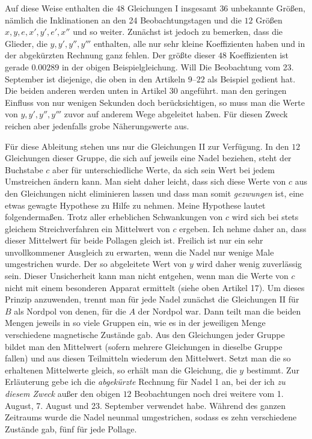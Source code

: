 Auf diese Weise enthalten die $48$ Gleichungen I insgesamt $36$ unbekannte Größen, nämlich die Inklinationen an den 24 Beobachtungstagen und die $12$ Größen $x,y,e,x',y',e',x''$ und so weiter. Zunächst ist jedoch zu bemerken, dass die Glieder, die $y,y',y'',y'''$ enthalten, alle nur sehr kleine Koeffizienten haben und in der abgekürzten Rechnung ganz fehlen. Der größte dieser $48$ Koeffizienten ist gerade $0.00289$ in der obigen Beispielgleichung. Will
\expandafter\def\csname HistoricalNoteText486\endcsname{Die Beobachtung vom 23. September ist diejenige, die oben in den Artikeln $9$–$22$ als Beispiel gedient hat. Die beiden anderen werden unten in Artikel $30$ angeführt.}
man den geringen Einfluss von nur wenigen Sekunden doch berücksichtigen, so muss man die Werte von $y,y',y'',y'''$ zuvor auf anderem Wege abgeleitet haben. Für diesen Zweck reichen aber jedenfalls grobe Näherungswerte aus.

Für diese Ableitung stehen uns nur die Gleichungen II zur Verfügung. In den $12$ Gleichungen dieser Gruppe, die sich auf jeweils eine Nadel beziehen, steht der Buchstabe $c$ aber für unterschiedliche Werte, da sich sein Wert bei jedem Umstreichen ändern kann. Man sieht daher leicht, dass sich diese Werte von $c$ aus den Gleichungen nicht eliminieren lassen und dass man somit \textit{gezwungen} ist, eine etwas gewagte Hypothese zu Hilfe zu nehmen. Meine Hypothese lautet folgendermaßen. Trotz aller erheblichen Schwankungen von $c$ wird sich bei stets gleichem Streichverfahren ein Mittelwert von $c$ ergeben. Ich nehme daher an, dass dieser Mittelwert für beide Pollagen gleich ist. Freilich ist nur ein sehr unvollkommener Ausgleich zu erwarten, wenn die Nadel nur wenige Male umgestrichen wurde. Der so abgeleitete Wert von $y$ wird daher wenig zuverlässig sein. Dieser Unsicherheit kann man nicht entgehen, wenn man die Werte von $c$ nicht mit einem besonderen Apparat ermittelt (siehe oben Artikel 17). Um dieses Prinzip anzuwenden, trennt man für jede Nadel zunächst die Gleichungen II für $B$ als Nordpol von denen, für die $A$ der Nordpol war. Dann teilt man die beiden Mengen jeweils in so viele Gruppen ein, wie es in der jeweiligen Menge verschiedene magnetische Zustände gab. Aus den Gleichungen jeder Gruppe bildet man den Mittelwert (sofern mehrere Gleichungen in dieselbe Gruppe fallen) und aus diesen Teilmitteln wiederum den Mittelwert. Setzt man die so erhaltenen Mittelwerte gleich, so erhält man die Gleichung, die $y$ bestimmt. Zur Erläuterung gebe ich die \textit{abgekürzte} Rechnung für Nadel 1 an, bei der ich \textit{zu diesem Zweck} außer den obigen $12$ Beobachtungen noch drei weitere vom 1. August, 7. August und 23. September verwendet habe. Während des ganzen Zeitraums wurde die Nadel neunmal umgestrichen, sodass es zehn verschiedene Zustände gab, fünf für jede Pollage.

